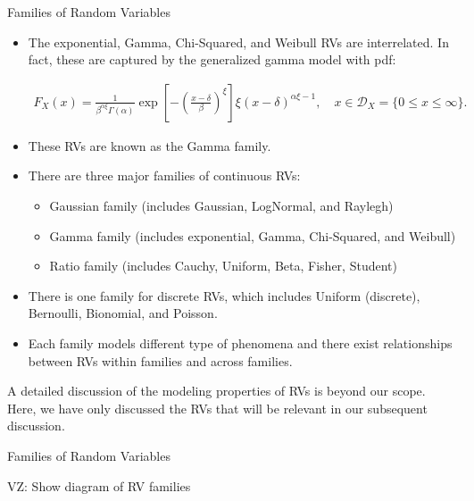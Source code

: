 \documentclass[9pt]{beamer}
\begin{document}
%
\begin{frame}{Families of Random Variables}
\begin{itemize}

\item The exponential, Gamma, Chi-Squared, and Weibull RVs are interrelated. In fact, these are captured by the generalized gamma model with pdf:
\begin{block}{}
\begin{align*}
F_X(x)=\frac{1}{\beta^{\alpha\xi}\Gamma(\alpha)}\exp\left[-\left(\frac{x-\delta}{\beta}\right)^\xi\right]\xi(x-\delta)^{\alpha\xi-1},\quad x\in \mathcal{D}_X=\{0\leq x\leq \infty\}.
\end{align*}
\end{block}
\item These RVs are known as the Gamma family. 
\item There are three major families of continuous RVs: 
\begin{itemize}
\item Gaussian family (includes Gaussian, LogNormal, and Raylegh)
\item Gamma family (includes exponential, Gamma, Chi-Squared, and Weibull)
\item Ratio family (includes Cauchy, Uniform, Beta, Fisher, Student)
\end{itemize}

\item There is one family for discrete RVs, which includes Uniform (discrete), Bernoulli, Bionomial, and Poisson.

\item Each family models different type of phenomena and there exist relationships between RVs within families and across families. 

\end{itemize}
A detailed discussion of the modeling properties of RVs is beyond our scope. Here, we have only discussed the RVs that will be relevant in our subsequent discussion. 

\end{frame}

%
\begin{frame}{Families of Random Variables}

\begin{block}{}
{\color{red} VZ: Show diagram of RV families}
\end{block}

\end{frame}
\end{document}
